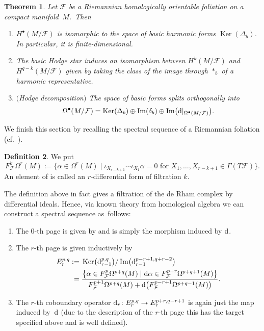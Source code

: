 \documentclass[pdftex]{sigma}
\numberwithin{equation}{section}
\newtheorem{tw}{Theorem}[section]
\theoremstyle{definition}
\newtheorem{defi}[tw]{Definition}
\begin{document}
\begin{tw}\label{HD} Let $\mathcal{F}$ be a Riemannian homologically orientable foliation on a compact manifold~$M$.~Then
\begin{enumerate}\itemsep=0pt
\item[$1.$] $H^{\bullet}(M\slash\mathcal{F})$ is isomorphic to the space of basic harmonic forms $\operatorname{Ker}(\Delta_b)$. In particular, it is finite-dimensional.
\item[$2.$] The basic Hodge star induces an isomorphism between $H^{k}(M\slash\mathcal{F})$ and $H^{q-k}(M\slash\mathcal{F})$ given by taking the class of the image through $*_b$ of a harmonic representative.
\item[$3.$] $($Hodge decomposition$)$ The space of basic forms splits orthogonally into
\[\Omega^{\bullet}(M\slash\mathcal{F})=\operatorname{Ker}(\Delta_b)\oplus \operatorname{Im}(\delta_b)\oplus \operatorname{Im}\bigl({\rm d}|_{\Omega^{\bullet}(M\slash\mathcal{F})}\bigr).\]
\end{enumerate}
\end{tw}
We finish this section by recalling the spectral sequence of a Riemannian foliation (cf.~\cite{ss1,ss2,ss3}).
\begin{defi}%
We put
\[F^k_{\mathcal{F}}\Omega^r(M):=\{\alpha\in\Omega^r(M)\mid \iota_{X_{r-k+1}}\cdots \iota_{X_1}\alpha=0\text{ for } X_1,\dots,X_{r-k+1}\in\Gamma(T\mathcal{F})\}.\]
An element of  is called an $r$-differential form of filtration $k$.
\end{defi}
The definition above in fact gives a filtration of the de Rham complex by differential ideals. Hence, via known theory from homological algebra we can construct a spectral sequence as~follows:
\begin{enumerate}\itemsep=0pt
\item The $0$-th page is given by  and  is simply the morphism induced by ${\rm d}$.
\item The $r$-th page is given inductively by
\begin{align*}
E_{r}^{p,q}:={}&\operatorname{Ker}\bigl({\rm d}^{p,q}_{r-1}\bigr)\slash \operatorname{Im}\bigl({\rm d}^{p-r+1,q+r-2}_{r-1}\bigr)\\
={}&\frac{\bigl\{\alpha\in F^{p}_{\mathcal{F}}\Omega^{p+q}(M)\mid {\rm d}\alpha\in F_{\mathcal{F}}^{p+r}\Omega^{p+q+1}(M)\bigr\}}{F^{p+1}_{\mathcal{F}} \Omega^{p+q}(M)+{\rm d}\bigl(F_{\mathcal{F}}^{p-r+1}\Omega^{p+q-1}(M)\bigr)}.
\end{align*}
\item The $r$-th coboundary operator ${\rm d}_r\colon E_r^{p,q}\to E^{p+r,q-r+1}_r$ is again just the map induced by~${\rm d}$ (due to the description of the $r$-th page this has the target specified above and is well defined).
\end{enumerate}
\end{document}

